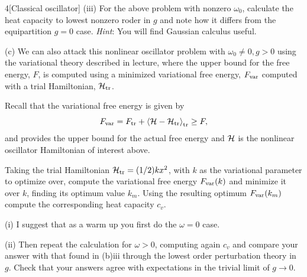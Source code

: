 \documentclass[12pt]{article}
\begin{document}
\begin{problem}{4}[Classical oscillator]
\qquad(iii) For the above problem with nonzero $\omega_0$, calculate the heat
capacity to lowest nonzero roder in $g$ and note how it differs from the
equipartition $g=0$ case. \textit{Hint}: You will find Gaussian calculus useful.
\begin{solution}
    
\end{solution}

(c) We can also attack this nonlinear oscillator problem with
$\omega_0\neq0,g>0$ using the variational theory described in lecture, where the
upper bound for the free energy, $F$, is computed using a minimized variational
free energy, $F_{\text{var}}$ computed with a trial Hamiltonian, $\mathcal{H}_{\text{tr}}$.

Recall that the variational free energy is given by
\begin{equation}
    F_{\text{var}}=F_{\text{tr}}+\expval{\mathcal{H}-\mathcal{H}_{\text{tr}}}_{\text{tr}}\geq F, 
\end{equation}
and provides the upper bound for the actual free energy and $\mathcal{H}$ is the
nonlinear oscillator Hamiltonian of interest above.

Taking the trial Hamiltonian $\mathcal{H}_{\text{tr}}=(1/2)kx^2$, with $k$ as the variational
parameter to optimize over, compute the variational free energy $F_{\text{var}}(k)$
and minimize it over $k$, finding its optimum value $k_m$. Using the resulting
optimum $F_{\text{var}}(k_m)$ compute the corresponding heat capacity $c_v$.

\qquad(i) I suggest that as a warm up you first do the $\omega=0$ case.

\qquad(ii) Then repeat the calculation for $\omega>0$, computing again $c_v$ and
compare your answer with that found in (b)iii through the lowest order
perturbation theory in $g$. Check that your answers agree with expectations in
the trivial limit of $g\to0$. 
\begin{solution}
    
\end{solution}
\end{problem}
\newpage
\end{document}
